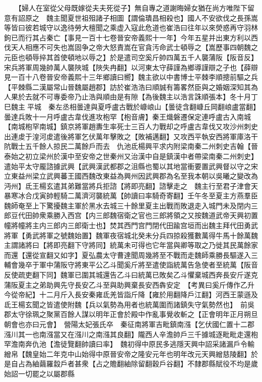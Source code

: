 　　【婦人在室從父母既嫁從夫夫死從子】無自專之道謝晦婦女猶在尚方唯陛下留意有詔原之　魏主聞夏世祖殂諸子相圖【謂倫璝昌相殺也】國人不安欲伐之長孫嵩等皆曰彼若城守以逸待勞大檀聞之乘虚入寇此危道也崔浩曰往年以來熒惑再守羽林鉤已而行其占秦亡【事見一百十七卷晉安帝義熙十一年】今年五星并出東方利以西伐天人相應不可失也嵩固争之帝大怒責嵩在官貪汚命武士頓辱之【嵩歷事四朝魏之元臣也頓辱捽其首使頓地以辱之】於是遣司空奚斤帥四萬五千人襲蒲阪【阪音反】宋兵將軍周幾帥萬人襲陜城【陜失冉翻】以河東太守薛謹為鄉導謹辯之子也【薛辯見一百十八卷晉安帝義熙十三年鄉讀曰嚮】魏主欲以中書博士平棘李順摠前驅之兵【平棘縣二漢屬常山晉魏屬趙郡】訪於崔浩浩曰順誠有籌畧然臣與之婚姻深知其為人果於去就不可專委帝乃止浩與順由是有隙【為後魏主以浩言誅順張本】冬十月丁巳魏主平城　秦左丞相曇達與夏呼盧古戰於嵻㟍山【曇徒含翻嵻丘岡翻㟍盧當翻】曇達兵敗十一月呼盧古韋伐進攻枹罕【枹音膚】秦王熾磐遷保定連呼盧古入南城【南城枹罕南城】鎮京將軍趙夀生率死士三百人力戰却之呼盧古韋伐又攻沙州刺史出連䖍于湟河䖍遣後將軍乞伏萬年擊敗之【敗補邁翻】又攻西平執安西將軍庫洛干阬戰士五千餘人掠民二萬餘戶而去　仇池氐楊興平求内附梁南秦二州刺史吉翰【晉泰始之初立梁州於漢中至安帝之世秦州又治漢中自是鎮漢中者帶梁南秦二州刺史】遣始平太守龎諮據武興【武興漢武都郡之沮縣也蜀以其地當衝要置武興督以守之宋立東益州梁立武興蕃王國西魏改東益為興州因武興郡為名至我本朝以吳曦之變改為沔州】氐王楊玄遣其弟難當將兵拒諮【將即亮翻】諮擊走之　魏主行至君子津會天暴寒冰合戊寅帥輕騎二萬濟河襲統萬【帥讀曰率騎奇寄翻】壬午冬至夏主方燕羣臣魏師奄至上下驚擾魏主軍於黑水去城三十餘里夏主出戰而敗退走入城門未及閉内三郎豆代田帥衆乘勝入西宫【内三郎魏宿衛之官也三郎將領之又按魏道武帝天興初置幢將幢將主内三郎内三郎衛士也】焚其西門宫門閉代田踰宫垣而出魏主拜代田勇武將軍【勇武將軍之號魏始置】魏軍夜宿城北癸未分兵四掠殺獲數萬得牛馬十餘萬魏主謂諸將曰【將即亮翻下守將同】統萬未可得也它年當與卿等取之乃徙其民萬餘家而還【還從宣翻又如字】夏弘農太守曹達聞周幾將至不戰而走魏師乘勝長驅遂入三輔會幾卒于軍中蒲阪守將東平公乙斗聞奚斤將至遣使詣統萬告急使者至統萬【阪音反使疏吏翻下同】魏軍已圍其城還告乙斗曰統萬已敗矣乙斗懼棄城西奔長安斤遂克蒲阪夏主之弟助興先守長安乙斗至與助興棄長安西犇安定　【考異曰奚斤傳作乙升今從帝紀】十二月斤入長安秦雍氐羌皆詣斤降【雍於用翻降戶江翻】河西王蒙遜及氐王楊玄聞之皆遣使附魏【兵以氣勢為用者也統萬圍而諸鎮失守氣勢然也】　前吳郡太守徐珮之聚黨百餘人謀以明年正會於殿中作亂事覺收斬之【正會明年正月朔旦朝會也亦曰元會】　營陽太妃張氏卒　秦征南將軍吉毗鎮南漒【乞伏國仁置十二郡漒川其一也南漒當又在漒川之南漒其良翻】隴西人辛澹帥戶三千據城逐毗毗走還枹罕澹南奔仇池【澹徒覽翻帥讀曰率】　魏初得中原民多逃隱天興中詔采諸漏戶令輸繒帛【魏皇始二年克中山始得中原晉安帝之隆安元年也明年改元天興繒慈陵翻】於是自占為紬繭羅縠戶者甚衆【占之贍翻紬除留翻穀戶谷翻】不隸郡縣賦役不均是歲始詔一切罷之以屬郡縣


